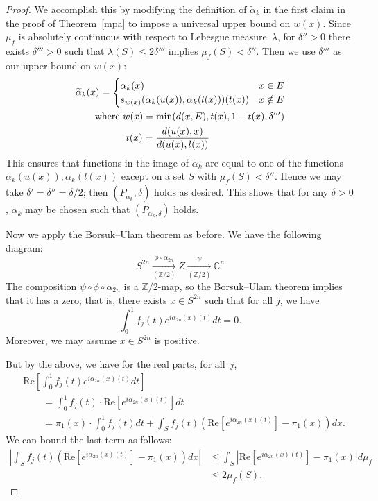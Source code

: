 \documentclass[11pt, reqno, english]{amsart}
\theoremstyle{plain}
\theoremstyle{definition}
\renewcommand{\Re}{\mathrm{Re}}
\begin{document}
\begin{proof}
  We accomplish this by modifying the definition of $\widetilde{\alpha}_{k}$ in 
  the first claim in the proof of Theorem~\ref{mpa} to impose a universal upper bound on
  $w(x)$. Since $\mu_{f}$ is absolutely continuous with respect to Lebesgue
  measure~$\lambda$, for $\delta'' > 0$ there exists $\delta''' > 0$ such that $\lambda(S) \le
  2\delta'''$ implies $\mu_{f}(S) < \delta''$. Then we use $\delta'''$ as our
  upper bound on $w(x)$:
  \begin{align*}
    &\widetilde{\alpha}_{k}(x) = \begin{cases}
      \alpha_{k}(x) & x \in E\\
      s_{w(x)}(\alpha_{k}(u(x)), \alpha_{k}(l(x)))(t(x)) & x \notin E
    \end{cases}\\
    &\qquad\text{where }w(x) = \min(d(x, E), t(x), 1 - t(x), \delta''')\\
    &\qquad\hphantom{\text{where }}\,\, t(x) = \frac{d(u(x), x)}{d(u(x), l(x))}
  \end{align*}
  This ensures that functions in the image of $\widetilde{\alpha}_{k}$ are equal to
  one of the functions $\alpha_{k}(u(x)), \alpha_{k}(l(x))$ except on a set $S$
  with $\mu_{f}(S) < \delta''$. Hence we may take $\delta' = \delta'' = \delta
  / 2$; then $(P_{\widetilde{\alpha_{k}}}, \delta)$ holds as desired. This shows
  that for any $\delta > 0$, $\alpha_{k}$ may be chosen such that
  $(P_{\alpha_{k}, \delta})$ holds.

  Now we apply the Borsuk--Ulam theorem as before. We have the following diagram:
  $$S^{2n} \xrightarrow[(\mathbb{Z}/2)]{\phi \circ \alpha_{2n}} Z
  \xrightarrow[(\mathbb{Z}/2)]{\psi} \mathbb{C}^{n}$$
  The composition $\psi \circ \phi \circ \alpha_{2n}$ is a
  $\mathbb{Z}/{2}$-map, so the Borsuk--Ulam theorem implies that it has a zero; that is,
  there exists $x \in S^{2n}$ such that for all $j$, we have
  $$\int_{0}^{1}f_{j}(t)e^{i\alpha_{2n}(x)(t)}dt = 0.$$
  Moreover, we may assume $x \in S^{2n}$ is positive.
  
  But by the above, we have for the real parts, for all~$j$,
  \begin{align*}
    &\Re\left[\int_{0}^{1}f_{j}(t)e^{i\alpha_{2n}(x)(t)}dt\right]\\
    &\qquad = \int_{0}^{1}f_{j}(t) \cdot \Re[e^{i\alpha_{2n}(x)(t)}]dt\\
    &\qquad = \pi_{1}(x) \cdot \int_{0}^{1}f_{j}(t)dt +
    \int_{S}f_{j}(t)(\Re[e^{i\alpha_{2n}(x)(t)}] - \pi_{1}(x))dx.
  \end{align*}
  We can bound the last term as follows:
  \begin{align*}
    \left|\int_{S}f_{j}(t)(\Re[e^{i\alpha_{2n}(x)(t)}] -
    \pi_{1}(x))dx\right| &\le \int_{S}|\Re[e^{i\alpha_{2n}(x)(t)}] -
    \pi_{1}(x)|d\mu_{f}\\
    &\le 2\mu_{f}(S).
  \end{align*}


\end{proof}
\end{document}
